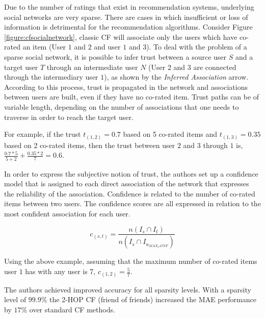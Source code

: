 Due to the number of ratings that exist in recommendation systems, underlying
social networks are very sparse. There are cases in which insufficient or loss
of information is detrimental for the recommendation algorithms. Consider
Figure \ref{figure:cfsocialnetwork}, classic CF will associate only the users
which have co-rated an item (User $1$ and $2$ and user $1$ and $3$). To deal
with the problem of a sparse social network, it is possible to infer trust
between a source user $S$ and a target user $T$ through an intermediate user
$N$ (User $2$ and $3$ are connected through the intermediary user $1$), as
shown by the \emph{Inferred Association} arrow. According to this process,
trust is propagated in the network and associations between users are built,
even if they have no co-rated item. Trust paths can be of variable length,
depending on the number of associations that one needs to traverse in order to
reach the target user.

For example, if the trust $t_{(1,2)} = 0.7$ based on 5 co-rated items
and $t_{(1,3)} = 0.35$ based on 2 co-rated items, then the trust
between user $2$ and $3$ through $1$ is, $\frac{0.7*5}{5+2} + \frac{0.35*2}{7} = 0.6$.

In order to express the subjective notion of trust, the authors set up a
confidence model that is assigned to each direct association of the network
that expresses the reliability of the association. Confidence is related to the
number of co-rated items between two users. The confidence scores are all
expressed in relation to the most confident association for each user.

\begin{equation}
c_{(s,t)} = \frac{n(I_{s} \cap I_{t})}{n(I_{s} \cap I_{u_{MAX_CONF}})}
\end{equation}

Using the above example, assuming that the maximum number of co-rated items
user $1$ has with any user is 7, $c_{(1,2)} = \frac{5}{7}$.

The authors achieved improved accuracy for all sparsity levels. With a sparsity
level of $99.9\%$ the 2-HOP CF (friend of friends) increased the MAE
performance by $17\%$ over standard CF methods.


